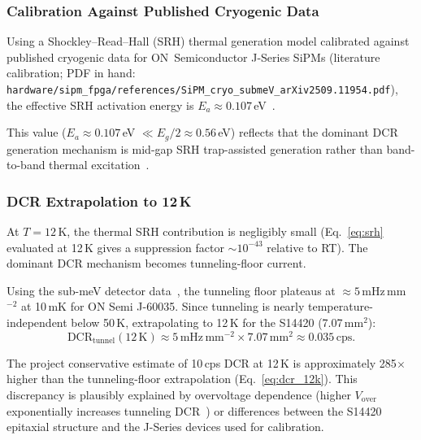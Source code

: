 \subsubsection{Calibration Against Published Cryogenic Data}

Using a Shockley--Read--Hall (SRH) thermal generation model calibrated against published
cryogenic data for ON~Semiconductor J-Series SiPMs (literature calibration;
PDF in hand: \texttt{hardware/sipm\_fpga/references/SiPM\_cryo\_submeV\_arXiv2509.11954.pdf}),
the effective SRH activation energy is $E_a \approx 0.107$\,eV~\cite{SiPMcryoSubmeV2025}.

This value ($E_a \approx 0.107$\,eV $\ll E_g/2 \approx 0.56$\,eV) reflects that the
dominant DCR generation mechanism is mid-gap SRH trap-assisted generation rather than
band-to-band thermal excitation~\cite{Liu2022SiPMLN2}.

\subsubsection{DCR Extrapolation to 12\,K}

At $T = 12$\,K, the thermal SRH contribution is negligibly small (Eq.~\ref{eq:srh}
evaluated at 12\,K gives a suppression factor $\sim 10^{-43}$ relative to RT). The
dominant DCR mechanism becomes tunneling-floor current.

Using the sub-meV detector data~\cite{SiPMcryoSubmeV2025}, the tunneling floor
plateaus at $\approx 5$\,mHz\,mm$^{-2}$ at 10\,mK for ON Semi J-60035.
Since tunneling is nearly temperature-independent below 50\,K, extrapolating to
12\,K for the S14420 (7.07\,mm$^2$):
\begin{equation}
  \mathrm{DCR}_{\mathrm{tunnel}}(12\,\mathrm{K})
  \approx 5\,\mathrm{mHz}\,\mathrm{mm}^{-2} \times 7.07\,\mathrm{mm}^2
  \approx 0.035\,\mathrm{cps}.
  \label{eq:dcr_12k}
\end{equation}

The project conservative estimate of 10\,cps DCR at 12\,K is approximately 285$\times$
higher than the tunneling-floor extrapolation (Eq.~\ref{eq:dcr_12k}). This discrepancy
is plausibly explained by overvoltage dependence (higher $V_\mathrm{over}$ exponentially
increases tunneling DCR~\cite{SiPMcryoSubmeV2025}) or differences between the S14420
epitaxial structure and the J-Series devices used for calibration.

